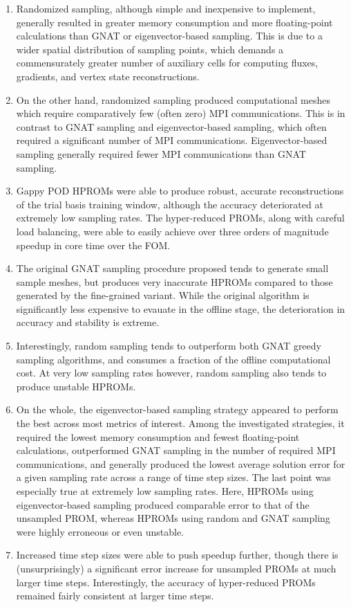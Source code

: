 \begin{enumerate}
    \item Randomized sampling, although simple and inexpensive to implement, generally resulted in greater memory consumption and more floating-point calculations than GNAT or eigenvector-based sampling. This is due to a wider spatial distribution of sampling points, which demands a commensurately greater number of auxiliary cells for computing fluxes, gradients, and vertex state reconstructions.
    \item On the other hand, randomized sampling produced computational meshes which require comparatively few (often zero) MPI communications. This is in contrast to GNAT sampling and eigenvector-based sampling, which often required a significant number of MPI communications. Eigenvector-based sampling generally required fewer MPI communications than GNAT sampling.
    \item Gappy POD HPROMs were able to produce robust, accurate reconstructions of the trial basis training window, although the accuracy deteriorated at extremely low sampling rates. The hyper-reduced PROMs, along with careful load balancing, were able to easily achieve over three orders of magnitude speedup in core time over the FOM.
    \item The original GNAT sampling procedure proposed tends to generate small sample meshes, but produces very inaccurate HPROMs compared to those generated by the fine-grained variant. While the original algorithm is significantly less expensive to evauate in the offline stage, the deterioration in accuracy and stability is extreme.
    \item Interestingly, random sampling tends to outperform both GNAT greedy sampling algorithms, and consumes a fraction of the offline computational cost. At very low sampling rates however, random sampling also tends to produce unstable HPROMs.
    \item On the whole, the eigenvector-based sampling strategy appeared to perform the best across most metrics of interest. Among the investigated strategies, it required the lowest memory consumption and fewest floating-point calculations, outperformed GNAT sampling in the number of required MPI communications, and generally produced the lowest average solution error for a given sampling rate across a range of time step sizes. The last point was especially true at extremely low sampling rates. Here, HPROMs using eigenvector-based sampling produced comparable error to that of the unsampled PROM, whereas HPROMs using random and GNAT sampling were highly erroneous or even unstable.
    \item Increased time step sizes were able to push speedup further, though there is (unsurprisingly) a significant error increase for unsampled PROMs at much larger time steps. Interestingly, the accuracy of hyper-reduced PROMs remained fairly consistent at larger time steps.
\end{enumerate}

